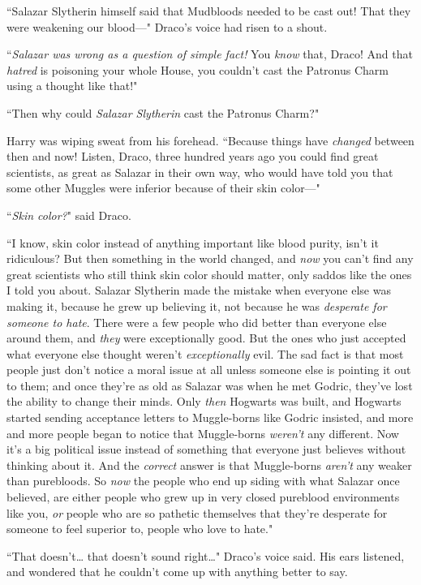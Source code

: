 ``Salazar Slytherin himself said that Mudbloods needed to be cast out! That they were weakening our blood—" Draco's voice had risen to a shout.

``\emph{Salazar was wrong as a question of simple fact!} You \emph{know} that, Draco! And that \emph{hatred} is poisoning your whole House, you couldn't cast the Patronus Charm using a thought like that!"

``Then why could \emph{Salazar Slytherin} cast the Patronus Charm?"

Harry was wiping sweat from his forehead. ``Because things have \emph{changed} between then and now! Listen, Draco, three hundred years ago you could find great scientists, as great as Salazar in their own way, who would have told you that some other Muggles were inferior because of their skin color—"

``\emph{Skin color?}" said Draco.

``I know, skin color instead of anything important like blood purity, isn't it ridiculous? But then something in the world changed, and \emph{now} you can't find any great scientists who still think skin color should matter, only saddos like the ones I told you about. Salazar Slytherin made the mistake when everyone else was making it, because he grew up believing it, not because he was \emph{desperate for someone to hate}. There were a few people who did better than everyone else around them, and \emph{they} were exceptionally good. But the ones who just accepted what everyone else thought weren't \emph{exceptionally} evil. The sad fact is that most people just don't notice a moral issue at all unless someone else is pointing it out to them; and once they're as old as Salazar was when he met Godric, they've lost the ability to change their minds. Only \emph{then} Hogwarts was built, and Hogwarts started sending acceptance letters to Muggle-borns like Godric insisted, and more and more people began to notice that Muggle-borns \emph{weren't} any different. Now it's a big political issue instead of something that everyone just believes without thinking about it. And the \emph{correct} answer is that Muggle-borns \emph{aren't} any weaker than purebloods. So \emph{now} the people who end up siding with what Salazar once believed, are either people who grew up in very closed pureblood environments like you, \emph{or} people who are so pathetic themselves that they're desperate for someone to feel superior to, people who love to hate."

``That doesn't{\ldots} that doesn't sound right{\ldots}" Draco's voice said. His ears listened, and wondered that he couldn't come up with anything better to say.

